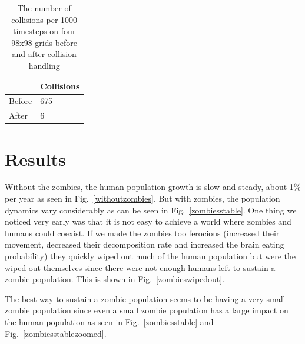 \documentclass{report}
\begin{document}
\begin{table}
\centering
\begin{tabular}{|l|l|}
\hline
& Collisions\\
\hline
Before & 675\\
\hline
After & 6\\
\hline
\end{tabular}
\caption{The number of collisions per 1000 timesteps on four 98x98 grids before and after collision handling}
\label{collisions}
\end{table}




\section{Results}


Without the zombies, the human population growth is slow and steady, about 1\% per year as seen in Fig.~\ref{withoutzombies}. But with zombies, the population dynamics vary considerably as can be seen in Fig.~\ref{zombiesstable}. One thing we noticed very early was that it is not easy to achieve a world where zombies and humans could coexist. If we made the zombies too ferocious (increased their movement, decreased their decomposition rate and increased the brain eating probability) they quickly wiped out much of the human population but were the wiped out themselves since there were not enough humans left to sustain a zombie population. This is shown in Fig.~\ref{zombieswipedout}.

The best way to sustain a zombie population seems to be having a very small zombie population since even a small zombie population has a large impact on the human population as seen in Fig.~\ref{zombiesstable} and Fig.~\ref{zombiesstablezoomed}.
\end{document}
